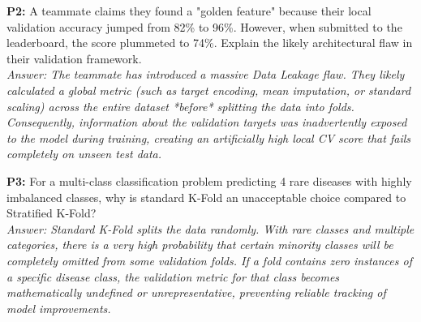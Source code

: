 \documentclass{article}
\begin{document}
\newline
\textbf{P2:} A teammate claims they found a "golden feature" because their local validation accuracy jumped from 82\% to 96\%. However, when submitted to the leaderboard, the score plummeted to 74\%. Explain the likely architectural flaw in their validation framework.
\\
\textit{Answer: The teammate has introduced a massive Data Leakage flaw. They likely calculated a global metric (such as target encoding, mean imputation, or standard scaling) across the entire dataset *before* splitting the data into folds. Consequently, information about the validation targets was inadvertently exposed to the model during training, creating an artificially high local CV score that fails completely on unseen test data.}

\newline
\textbf{P3:} For a multi-class classification problem predicting 4 rare diseases with highly imbalanced classes, why is standard K-Fold an unacceptable choice compared to Stratified K-Fold?
\\
\textit{Answer: Standard K-Fold splits the data randomly. With rare classes and multiple categories, there is a very high probability that certain minority classes will be completely omitted from some validation folds. If a fold contains zero instances of a specific disease class, the validation metric for that class becomes mathematically undefined or unrepresentative, preventing reliable tracking of model improvements.}
\end{document}
